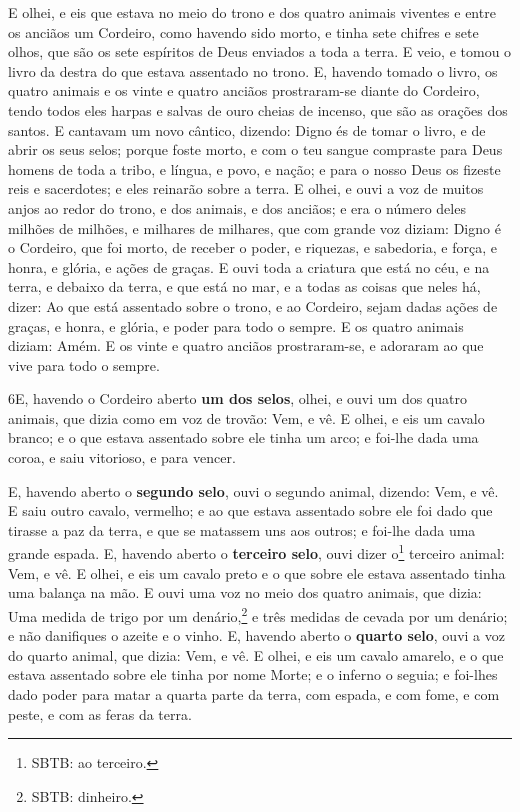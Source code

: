 E olhei, e eis que estava no meio do trono e dos quatro animais
viventes e entre os anciãos um Cordeiro, como havendo sido morto, e
tinha sete chifres e sete olhos, que são os sete espíritos de Deus
enviados a toda a terra. E veio, e tomou o livro da destra do
que estava assentado no trono. E, havendo tomado o livro, os
quatro animais e os vinte e quatro anciãos prostraram-se diante do
Cordeiro, tendo todos eles harpas e salvas de ouro cheias de
incenso, que são as orações dos santos. E cantavam um novo
cântico, dizendo: Digno és de tomar o livro, e de abrir os seus
selos; porque foste morto, e com o teu sangue compraste para Deus
homens de toda a tribo, e língua, e povo, e nação; e para o
nosso Deus os fizeste reis e sacerdotes; e eles reinarão sobre a
terra. E olhei, e ouvi a voz de muitos anjos ao redor do
trono, e dos animais, e dos anciãos; e era o número deles milhões de
milhões, e milhares de milhares, que com grande voz diziam:
Digno é o Cordeiro, que foi morto, de receber o poder, e riquezas, e
sabedoria, e força, e honra, e glória, e ações de graças. E
ouvi toda a criatura que está no céu, e na terra, e debaixo da
terra, e que está no mar, e a todas as coisas que neles há, dizer:
Ao que está assentado sobre o trono, e ao Cordeiro, sejam dadas
ações de graças, e honra, e glória, e poder para todo o sempre.
E os quatro animais diziam: Amém. E os vinte e quatro anciãos
prostraram-se, e adoraram ao que vive para todo o sempre.

\medskip

\lettrine{6} E, havendo o Cordeiro aberto \textbf{um dos
selos}, olhei, e ouvi um dos quatro animais, que dizia como em voz
de trovão: Vem, e vê. E olhei, e eis um cavalo branco; e o que
estava assentado sobre ele tinha um arco; e foi-lhe dada uma coroa,
e saiu vitorioso, e para vencer.

E, havendo aberto o \textbf{segundo selo}, ouvi o segundo animal,
dizendo: Vem, e vê. E saiu outro cavalo, vermelho; e ao que
estava assentado sobre ele foi dado que tirasse a paz da terra, e
que se matassem uns aos outros; e foi-lhe dada uma grande espada.
E, havendo aberto o \textbf{terceiro selo}, ouvi dizer
o\footnote{SBTB: ao terceiro.} terceiro animal: Vem, e vê. E olhei,
e eis um cavalo preto e o que sobre ele estava assentado tinha uma
balança na mão. E ouvi uma voz no meio dos quatro animais, que
dizia: Uma medida de trigo por um denário,\footnote{SBTB: dinheiro.}
e três medidas de cevada por um denário; e não danifiques o azeite e
o vinho. E, havendo aberto o \textbf{quarto selo}, ouvi a voz do
quarto animal, que dizia: Vem, e vê. E olhei, e eis um cavalo
amarelo, e o que estava assentado sobre ele tinha por nome Morte; e
o inferno o seguia; e foi-lhes dado poder para matar a quarta parte
da terra, com espada, e com fome, e com peste, e com as feras da
terra.

